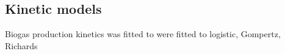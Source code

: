 \subsection{Kinetic models}
Biogas production kinetics was fitted to were fitted to logistic, Gompertz,
Richards